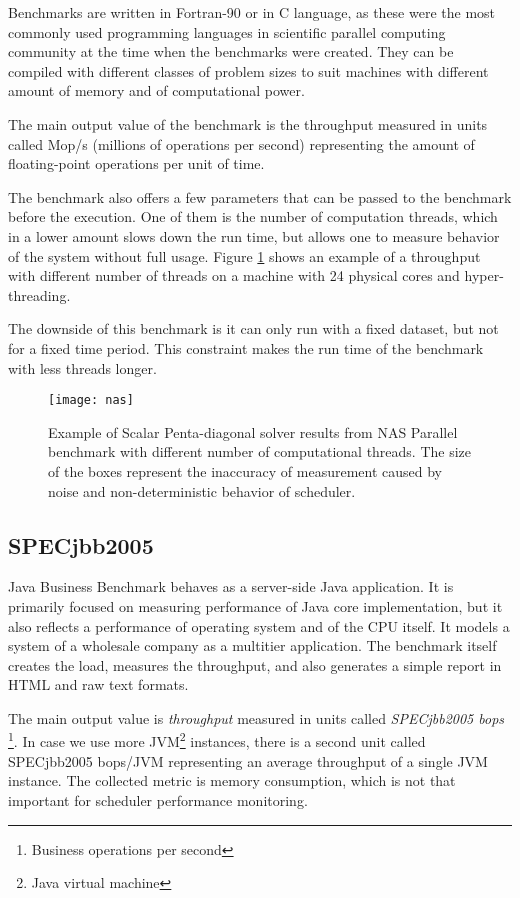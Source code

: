 Benchmarks are written in Fortran-90 or in C language, as these were the most
commonly used programming languages in scientific parallel computing community
at the time when the benchmarks were created. They can be compiled with
different classes of problem sizes to suit machines with different amount of
memory and of computational power.

The main output value of the benchmark is the throughput measured in units
called Mop/s (millions of operations per second) representing the amount of
floating-point operations per unit of time.

The benchmark also offers a few parameters that can be passed to the benchmark
before the execution. One of them is the number of computation threads, which in
a lower amount slows down the run time, but allows one to measure behavior of
the system without full usage. Figure \ref{fig:nas} shows an example of a
throughput with different number of threads on a machine with 24 physical cores
and hyper-threading.

The downside of this benchmark is it can only run with a fixed dataset, but not
for a fixed time period. This constraint makes the run time of the benchmark
with less threads longer.

\begin{figure}
  \centering
  \texttt{[image: nas]}
  \caption{Example of Scalar Penta-diagonal solver results from NAS Parallel
    benchmark with different number of computational threads. The size of the
    boxes represent the inaccuracy of measurement caused by noise and
    non-deterministic behavior of scheduler.}
  \label{fig:nas}
\end{figure}

\subsection{SPECjbb2005}
Java Business Benchmark behaves as a server-side Java application. It is
primarily focused on measuring performance of Java core implementation, but it
also reflects a performance of operating system and of the CPU itself. It models
a system of a wholesale company as a multitier application. The benchmark itself
creates the load, measures the throughput, and also generates a simple report in
HTML and raw text formats.

The main output value is \emph{throughput} measured in units called
\emph{SPECjbb2005 bops} \footnote{Business operations per second}. In case we
use more JVM\footnote{Java virtual machine} instances, there is a second unit
called SPECjbb2005 bops/JVM representing an average throughput of a single JVM
instance. The collected metric is memory consumption, which is not that
important for scheduler performance monitoring.

